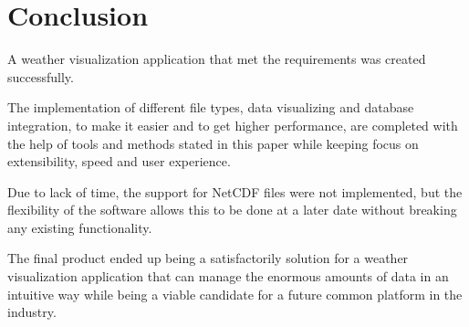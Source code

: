 \chapter{Conclusion}
A weather visualization application that met the requirements was created successfully.

The implementation of different file types, data visualizing and database integration, to make it easier and to get higher performance, are completed with the help of tools and methods stated in this paper while keeping focus on extensibility, speed and user experience.

Due to lack of time, the support for NetCDF files were not implemented, but the flexibility of the software allows this to be done at a later date without breaking any existing functionality.

The final product ended up being a satisfactorily solution for a weather visualization application that can manage the enormous amounts of data in an intuitive way while being a viable candidate for a future common platform in the industry.